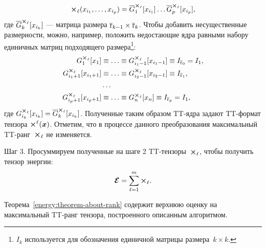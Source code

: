 \begin{equation}
\label{energy:tt-for-partial-potential}
\boldsymbol{\mathcal{\Theta}}_\ell(x_{i_1}, \ldots, x_{i_p}) = \overline{G}^{\boldsymbol{\mathcal{\Theta}}_\ell}_1[x_{i_1}] \ldots \overline{G}^{\boldsymbol{\mathcal{\Theta}}_\ell}_p[x_{i_p}],
\end{equation}
где $\overline{G}^{\boldsymbol{\mathcal{\Theta}}_\ell}_k[x_{i_k}]$ --- матрица размера $\overline{\operatorname{r}}_{k-1} \times \overline{\operatorname{r}}_k$. Чтобы добавить несущественные размерности, можно, например, положить недостающие ядра равными набору единичных матриц подходящего размера\footnote{$I_k$ используется для обозначения единичной матрицы размера~$k \times k$.}:
\begin{equation*}
\begin{aligned}
G^{\boldsymbol{\mathcal{\Theta}}_\ell}_1[x_1] &\equiv  \ldots \equiv G^{\boldsymbol{\mathcal{\Theta}}_\ell}_{i_1 - 1}[x_{i_1 - 1}] \equiv I_{\overline{\operatorname{r}}_0} = I_1,\\
G^{\boldsymbol{\mathcal{\Theta}}_\ell}_{i_1 + 1}[x_{i_1 + 1}] &\equiv \ldots \equiv G^{\boldsymbol{\mathcal{\Theta}}_\ell}_{i_2 - 1}[x_{i_2 - 1}] \equiv I_{\overline{\operatorname{r}}_1},\\
&\ldots\\
G^{\boldsymbol{\mathcal{\Theta}}_\ell}_{i_p + 1}[x_{i_p + 1}] &\equiv \ldots \equiv G^{\boldsymbol{\mathcal{\Theta}}_\ell}_{n}[x_{n}] \equiv I_{\overline{\operatorname{r}}_p} = I_1,
\end{aligned}
\end{equation*}
где $G^{\boldsymbol{\mathcal{\Theta}}_\ell}_{i_k}[x_{i_k}] = \overline{G}^{\boldsymbol{\mathcal{\Theta}}_\ell}_{k}[x_{i_k}]$. Полученные таким образом TT\hyp{}ядра задают TT\hyp{}формат тензора $\boldsymbol{\mathcal{\Theta}}^\ell(\boldsymbol{x})$.
Отметим, что в процессе данного преобразования максимальный TT\hyp{}ранг~$\boldsymbol{\mathcal{\Theta}}_\ell$ не изменяется.

Шаг 3. Просуммируем полученные на шаге 2 TT\hyp{}тензоры~$\boldsymbol{\mathcal{\Theta}}_\ell$, чтобы получить тензор энергии:
\begin{equation}
\label{energy:energy-tensor-as-sum-of-potential-tensors}
\boldsymbol{\mathcal{E}} = \sum_{\ell=1}^m \boldsymbol{\mathcal{\Theta}}_\ell.
\end{equation}

Теорема~\ref{energy:theorem-about-rank} содержит верхнюю оценку на максимальный TT\hyp{}ранг тензора, построенного описанным алгоритмом.

